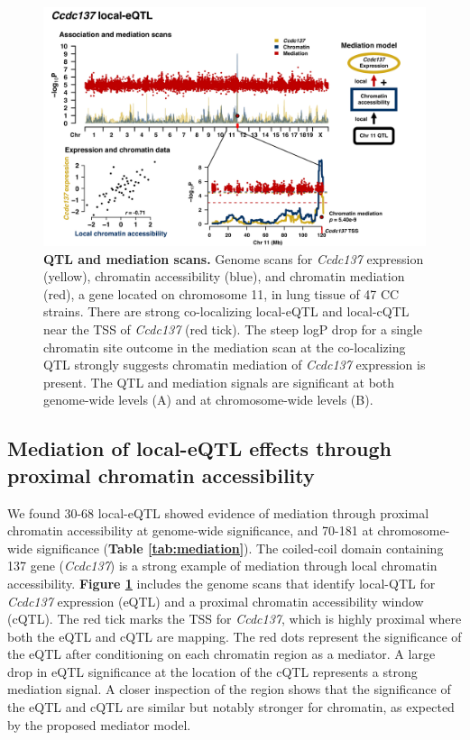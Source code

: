 \begin{figure}[h]
\includegraphics[width=\textwidth, trim={0in 0in 0in 0in}, clip]{figs/ccdc137_mediation.pdf}
\caption{\textbf{QTL and mediation scans.} Genome scans for \textit{Ccdc137} expression (yellow), chromatin accessibility (blue), and chromatin mediation (red), a gene located on chromosome 11, in lung tissue of 47 CC strains. There are strong co-localizing local-eQTL and local-cQTL near the TSS of \textit{Ccdc137} (red tick). The steep logP drop for a single chromatin site outcome in the mediation scan at the co-localizing QTL strongly suggests chromatin mediation of \textit{Ccdc137} expression is present. The QTL and mediation signals are significant at both genome-wide levels (A) and at chromosome-wide levels (B). \label{fig:ccdc137_mediation}}
\end{figure}

\subsection{Mediation of local-eQTL effects through proximal chromatin accessibility}

We found 30-68 local-eQTL showed evidence of mediation through proximal chromatin accessibility at genome-wide significance, and 70-181 at chromosome-wide significance (\textbf{Table \ref{tab:mediation}}). The coiled-coil domain containing 137 gene (\textit{Ccdc137}) is a strong example of mediation through local chromatin accessibility. \textbf{Figure \ref{fig:ccdc137_mediation}} includes the genome scans that identify local-QTL for \textit{Ccdc137} expression (eQTL) and a proximal chromatin accessibility window (cQTL). The red tick marks the TSS for \textit{Ccdc137}, which is highly proximal where both the eQTL and cQTL are mapping. The red dots represent the significance of the eQTL after conditioning on each chromatin region as a mediator. A large drop in eQTL significance at the location of the cQTL represents a strong mediation signal. A closer inspection of the region shows that the significance of the eQTL and cQTL are similar but notably stronger for chromatin, as expected by the proposed mediator model. 

